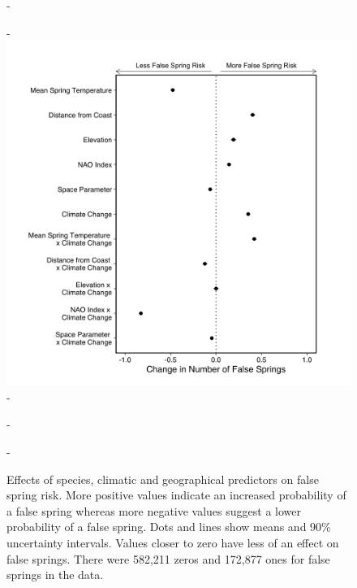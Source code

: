 \documentclass{article}\usepackage[]{graphicx}\usepackage[]{color}
\begin{document}
  
{\begin{figure} [H]
  -\begin{center}
  -\includegraphics[width=12cm]{..//analyses/figures/model_output_90.png}
  -\caption{Effects of species, climatic and geographical predictors on false spring risk. More positive values indicate an increased probability of a false spring whereas more negative values suggest a lower probability of a false spring. Dots and lines show means and 90\% uncertainty intervals. Values closer to zero have less of an effect on false springs. There were 582,211 zeros and 172,877 ones for false springs in the data.}\label{fig:maineffects}
  -\end{center}
  -\end{figure}}


  
\end{document}
